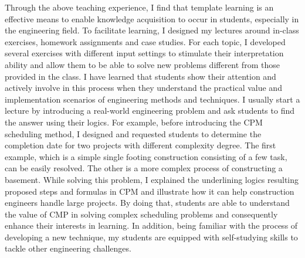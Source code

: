 \documentclass[a4paper,11pt]{article}
\begin{document}
%
%
\par
Through the above teaching experience, I find that template learning is an effective means to enable knowledge acquisition to occur in students, especially in the engineering field. To facilitate learning, I designed my lectures around in-class exercises, homework assignments and case studies. For each topic, I developed several exercises with different input settings to stimulate their interpretation ability and allow them to be able to solve new problems different from those provided in the class.
%
I have learned that students show their attention and actively involve in this process when they understand the practical value and implementation scenarios of engineering methods and techniques.
%
I usually start a lecture by introducing a real-world engineering problem and ask students to find the answer using their logics.  
%
For example, before introducing the CPM scheduling method, I designed and requested students to determine the completion date for two projects with different complexity degree. The first example, which is a simple single footing construction consisting of a few task, can be easily resolved. The other is a more complex process of constructing a basement. While solving this problem, I explained the underlining logics resulting proposed steps and formulas in CPM and illustrate how it can help construction engineers handle large projects. 
%
By doing that, students are able to understand the value of CMP in solving complex scheduling problems and consequently enhance their interests in learning. In addition, being familiar with the process of developing a new technique, my students are equipped with self-studying skills to tackle other engineering challenges. 
%
\par
\end{document}
